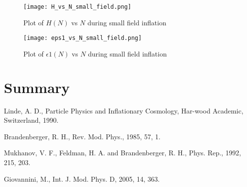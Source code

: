 \documentclass[12pt,a4paper,oneside]{book}
\begin{document}
\begin{figure}
\begin{center}
\texttt{[image: H\_vs\_N\_small\_field.png]}
\caption[Plot of $H(N)$ vs $N$ during small field inflation]{Plot of $H(N)$ vs $N$ during small field inflation}
\end{center}
\end{figure}

\begin{figure}
\begin{center}
\texttt{[image: eps1\_vs\_N\_small\_field.png]}
\caption[Plot of $\epsilon 1(N)$ vs $N$ during small field inflation]{Plot of $\epsilon 1(N)$ vs $N$ during small field inflation}
\end{center}
\end{figure}



\chapter{Summary}


%
%

\begin{thebibliography}{99}

Linde, A. D., Particle Physics and Inflationary Cosmology, Har-wood Academic, Switzerland, 1990.

Brandenberger, R. H., Rev. Mod. Phys., 1985, 57, 1.

Mukhanov, V. F., Feldman, H. A. and Brandenberger, R. H., Phys. Rep., 1992, 215, 203.

Giovannini, M., Int. J. Mod. Phys. D, 2005, 14, 363.

\end{thebibliography}
\end{document}
